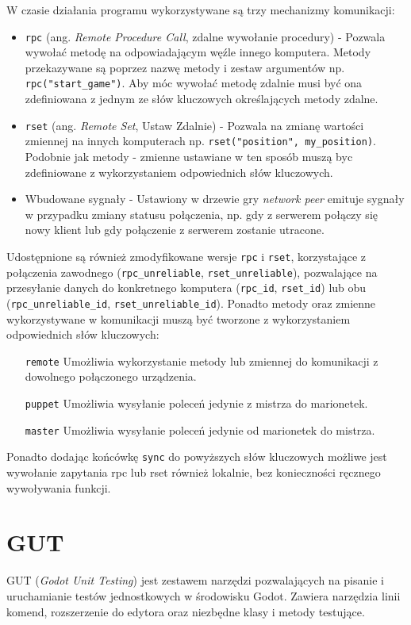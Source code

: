 W czasie działania programu wykorzystywane są trzy mechanizmy komunikacji:
\begin{itemize}
    \item \texttt{rpc} (ang. \emph{Remote Procedure Call}, zdalne wywołanie procedury) - Pozwala wywołać metodę na odpowiadającym węźle innego komputera. Metody przekazywane są poprzez nazwę metody i zestaw argumentów np. \texttt{rpc("start\_game")}. Aby móc wywołać metodę zdalnie musi być ona zdefiniowana z jednym ze słów kluczowych określających metody zdalne.
    \item \texttt{rset} (ang. \emph{Remote Set}, Ustaw Zdalnie) - Pozwala na zmianę wartości zmiennej na innych komputerach np. \texttt{rset("position", my\_position)}. Podobnie jak metody - zmienne ustawiane w ten sposób muszą byc zdefiniowane z wykorzystaniem odpowiednich słów kluczowych.
    \item  Wbudowane sygnały - Ustawiony w drzewie gry \emph{network peer} emituje sygnały w przypadku zmiany statusu połączenia, np. gdy z serwerem połączy się nowy klient lub gdy połączenie z serwerem zostanie utracone. 
\end{itemize}

Udostępnione są również zmodyfikowane wersje \texttt{rpc} i \texttt{rset}, korzystające z połączenia zawodnego (\texttt{rpc\_unreliable}, \texttt{rset\_unreliable}), pozwalające na przesyłanie danych do konkretnego komputera (\texttt{rpc\_id}, \texttt{rset\_id}) lub obu (\texttt{rpc\_unreliable\_id}, \texttt{rset\_unreliable\_id}). Ponadto metody oraz zmienne wykorzystywane w komunikacji muszą być tworzone z wykorzystaniem odpowiednich słów kluczowych:
\begin{itemize}
    \item[\texttt{remote}] Umożliwia wykorzystanie metody lub zmiennej do komunikacji z dowolnego połączonego urządzenia.
    \item[\texttt{puppet}] Umożliwia wysyłanie poleceń jedynie z mistrza do marionetek.
    \item[\texttt{master}] Umożliwia wysyłanie poleceń jedynie od marionetek do mistrza. 
\end{itemize}

Ponadto dodając końcówkę \texttt{sync} do powyższych słów kluczowych możliwe jest wywołanie zapytania rpc lub rset również lokalnie, bez konieczności ręcznego wywoływania funkcji.

\section{GUT}
GUT (\emph{Godot Unit Testing})\cite{gut_wiki} jest zestawem narzędzi pozwalających na pisanie i uruchamianie testów jednostkowych w środowisku Godot. Zawiera narzędzia linii komend, rozszerzenie do edytora oraz niezbędne klasy i metody testujące.

